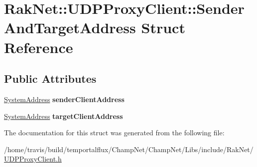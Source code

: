 \hypertarget{struct_rak_net_1_1_u_d_p_proxy_client_1_1_sender_and_target_address}{\section{Rak\-Net\-:\-:U\-D\-P\-Proxy\-Client\-:\-:Sender\-And\-Target\-Address Struct Reference}
\label{struct_rak_net_1_1_u_d_p_proxy_client_1_1_sender_and_target_address}
}
\subsection*{Public Attributes}
\begin{DoxyCompactItemize}
\item 
\hypertarget{struct_rak_net_1_1_u_d_p_proxy_client_1_1_sender_and_target_address_a090d7e99f8787a9078861393412b6e2b}{\hyperlink{struct_rak_net_1_1_system_address}{System\-Address} {\bfseries sender\-Client\-Address}}\label{struct_rak_net_1_1_u_d_p_proxy_client_1_1_sender_and_target_address_a090d7e99f8787a9078861393412b6e2b}

\item 
\hypertarget{struct_rak_net_1_1_u_d_p_proxy_client_1_1_sender_and_target_address_af32990ea35e5be5d7bd9bb3ab65120ba}{\hyperlink{struct_rak_net_1_1_system_address}{System\-Address} {\bfseries target\-Client\-Address}}\label{struct_rak_net_1_1_u_d_p_proxy_client_1_1_sender_and_target_address_af32990ea35e5be5d7bd9bb3ab65120ba}

\end{DoxyCompactItemize}


The documentation for this struct was generated from the following file\-:\begin{DoxyCompactItemize}
\item 
/home/travis/build/temportalflux/\-Champ\-Net/\-Champ\-Net/\-Libs/include/\-Rak\-Net/\hyperlink{_u_d_p_proxy_client_8h}{U\-D\-P\-Proxy\-Client.\-h}\end{DoxyCompactItemize}
